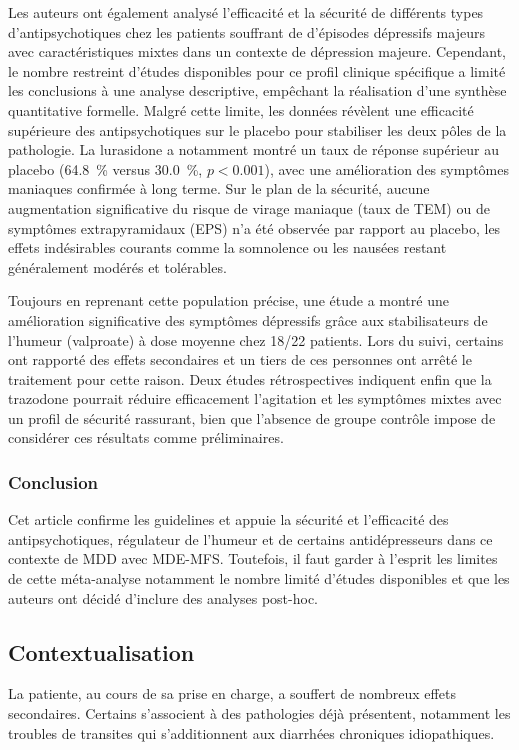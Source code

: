 \begin{itemize}[label=\textbullet]
    Les auteurs ont également analysé l’efficacité et la sécurité de différents types d’antipsychotiques chez les patients souffrant de d’épisodes dépressifs majeurs avec caractéristiques mixtes dans un contexte de dépression majeure. Cependant, le nombre restreint d'études disponibles pour ce profil clinique spécifique a limité les conclusions à une analyse descriptive, empêchant la réalisation d'une synthèse quantitative formelle. Malgré cette limite, les données révèlent une efficacité supérieure des antipsychotiques sur le placebo pour stabiliser les deux pôles de la pathologie. La lurasidone a notamment montré un taux de réponse supérieur au placebo (\qty{64.8}{\percent} versus \qty{30.0}{\percent}, $p < \num{0.001}$), avec une amélioration des symptômes maniaques confirmée à long terme.  Sur le plan de la sécurité, aucune augmentation significative du risque de virage maniaque (taux de TEM) ou de symptômes extrapyramidaux (EPS) n'a été observée par rapport au placebo, les effets indésirables courants comme la somnolence ou les nausées restant généralement modérés et tolérables.
    
    Toujours en reprenant cette population précise, une étude a montré une amélioration significative des symptômes dépressifs grâce aux stabilisateurs de l’humeur (valproate) à dose moyenne chez 18/22 patients. Lors du suivi, certains ont rapporté des effets secondaires et un tiers de ces personnes ont arrêté le traitement pour cette raison. Deux études rétrospectives indiquent enfin que la trazodone pourrait réduire efficacement l’agitation et les symptômes mixtes avec un profil de sécurité rassurant, bien que l’absence de groupe contrôle impose de considérer ces résultats comme préliminaires.
\end{itemize}
 
\subsubsection{Conclusion} 
 
Cet article confirme les guidelines et appuie la sécurité et l’efficacité des antipsychotiques, régulateur de l’humeur et de certains antidépresseurs dans ce contexte de MDD avec MDE-MFS. Toutefois, il faut garder à l’esprit les limites de cette méta-analyse notamment le nombre limité d’études disponibles et que les auteurs ont décidé d’inclure des analyses post-hoc. 
 
\subsection{Contextualisation}
La patiente, au cours de sa prise en charge, a souffert de nombreux effets secondaires. Certains s’associent à des pathologies déjà présentent, notamment les troubles de transites qui s’additionnent aux diarrhées chroniques idiopathiques. 

